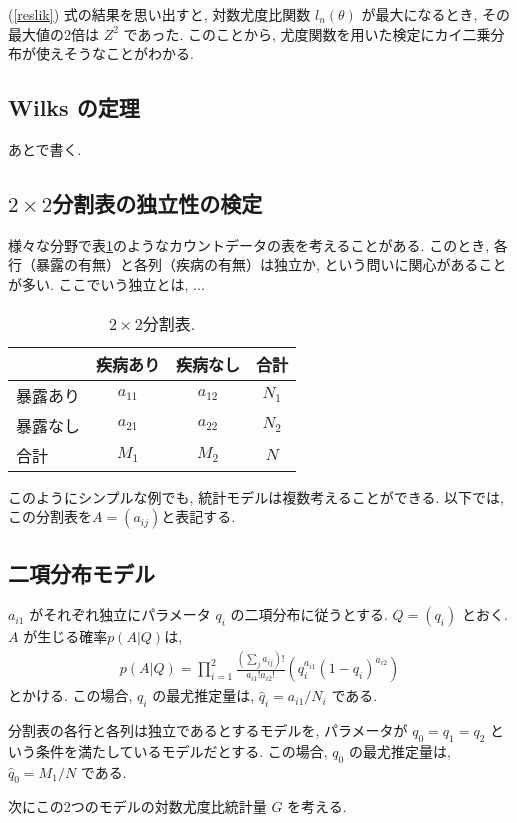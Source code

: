 \documentclass{jarticle}
\begin{document}
(\ref{reslik}) 式の結果を思い出すと, 対数尤度比関数 $l_n(\theta)$ が最大になるとき, その最大値の2倍は $Z^2$ であった. このことから, 尤度関数を用いた検定にカイ二乗分布が使えそうなことがわかる. 

\subsection{Wilks の定理}
\label{secWilks}
あとで書く. 

\subsection{$2 \times 2$分割表の独立性の検定}
様々な分野で表\ref{2by2}のようなカウントデータの表を考えることがある. このとき, 各行（暴露の有無）と各列（疾病の有無）は独立か, という問いに関心があることが多い. 
ここでいう独立とは, ...

\begin{table}[htbp]
\centering
\caption{$2 \times 2$分割表.}
\label{2by2}
\begin{tabular}{l|cc|c}
 & 疾病あり&疾病なし&合計\\
 \hline
 暴露あり&$a_{11}$&$a_{12}$&$N_1$\\
 暴露なし&$a_{21}$&$a_{22}$&$N_2$\\
  \hline
 合計　　& $M_1$ & $M_2$ & $N$
\end{tabular}
\end{table}

このようにシンプルな例でも, 統計モデルは複数考えることができる. 以下では, この分割表を$A=(a_{ij})$と表記する. 

\subsection{二項分布モデル}
$a_{i1}$ がそれぞれ独立にパラメータ $q_i$ の二項分布に従うとする.  
$Q=(q_i)$ とおく. 
$A$ が生じる確率$p(A|Q)$は, 
\begin{align}
p(A|Q) = \prod_{i=1}^2 \frac{(\sum_j a_{ij})!}{a_{i1}!a_{i2}!}( q_i^{a_{i1}}(1-q_{i})^{a_{i2}})
\end{align}
とかける.
この場合, $q_i$ の最尤推定量は, $\hat q_{i}=a_{i1}/N_i$ である. 

分割表の各行と各列は独立であるとするモデルを, パラメータが $q_0=q_1=q_2$ という条件を満たしているモデルだとする. 
この場合, $q_0$ の最尤推定量は, $\hat q_{0}=M_1/N$ である.

次にこの2つのモデルの対数尤度比統計量 $G$ を考える.
\end{document}
